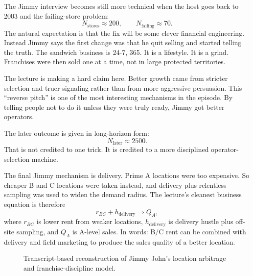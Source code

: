 The Jimmy interview becomes still more technical when the host goes back to 2003 and the failing-store problem:
\begin{equation}
N_{\mathrm{stores}}\approx 200,\qquad N_{\mathrm{failing}}\approx 70.
\end{equation}
The natural expectation is that the fix will be some clever financial engineering. Instead Jimmy says the first change was that he quit selling and started telling the truth. The sandwich business is 24-7, 365. It is a lifestyle. It is a grind. Franchises were then sold one at a time, not in large protected territories.

The lecture is making a hard claim here. Better growth came from stricter selection and truer signaling rather than from more aggressive persuasion. This ``reverse pitch'' is one of the most interesting mechanisms in the episode. By telling people not to do it unless they were truly ready, Jimmy got better operators.

The later outcome is given in long-horizon form:
\begin{equation}
N_{\mathrm{later}}\approx 2500.
\end{equation}
That is not credited to one trick. It is credited to a more disciplined operator-selection machine.

The final Jimmy mechanism is delivery. Prime A locations were too expensive. So cheaper B and C locations were taken instead, and delivery plus relentless sampling was used to widen the demand radius. The lecture's cleanest business equation is therefore
\begin{equation}
r_{BC}+h_{\mathrm{delivery}} \Rightarrow Q_A,
\end{equation}
where \(r_{BC}\) is lower rent from weaker locations, \(h_{\mathrm{delivery}}\) is delivery hustle plus off-site sampling, and \(Q_A\) is A-level sales. In words: B/C rent can be combined with delivery and field marketing to produce the sales quality of a better location.

\begin{figure}[h]
\centering
{}
\caption{Transcript-based reconstruction of Jimmy John's location arbitrage and franchise-discipline model.}
\end{figure}

